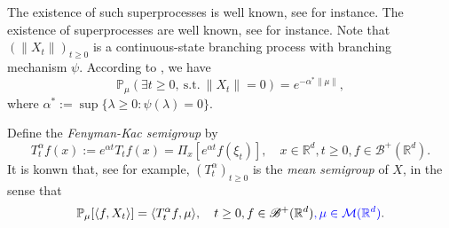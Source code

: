 \documentclass[12pt,oneside,english]{amsart}
\theoremstyle{plain}
\theoremstyle{definition}
\numberwithin{equation}{section}
\newcommand{\added}[1]{{\color{blue}#1}}\newcommand{\deleted}[1]{{\color{red}#1}}
\begin{document}
\deleted{
	The existence of such superprocesses is well known, see \cite{EB} for instance.
}
\added{
	The existence of superprocesses are well known, see \cite{EB} for instance.
}
    Note that $(\|X_t\|)_{t\geq 0}$ is a continuous-state branching process with branching mechanism $\psi$.
    According to \cite[Theorem 12.5 \& Theorem 12.7]{Kyprianou2014Fluctuations}, we have
\begin{equation}
    \mathbb{P}_{\mu} (\exists t\geq 0,~\text{s.t.}~\|X_t\|=0)
    = e^{-\alpha^* \|\mu\|},
\end{equation}
    where $\alpha^* := \sup\{\lambda \geq 0: \psi(\lambda) = 0\}$.
    
    Define the \emph{Fenyman-Kac semigroup} by
\begin{equation}\label{meansemigroup}
    T^{\alpha}_t f(x)
    :=
    e^{\alpha t} T_t f(x) =
    \Pi_x [e^{\alpha t}f(\xi_t)],
    \quad x\in \mathbb{R}^d,t\geq 0, f\in \mathscr B^+(\mathbb R^d).
\end{equation}
    It is konwn that, see \cite[Proposition 2.27]{Li2011Measure-valued} for example, $(T^\alpha_t)_{t\geq 0}$ is the \emph{mean semigroup} of $X$, in the sense that
\begin{equation}\label{eq:meanformula}
    \mathbb{P}_{\mu}[\langle f, X_t \rangle]
    = \langle T_t^\alpha f, \mu \rangle,
    \quad t\geq 0, f\in \mathscr B^+(\mathbb R^d)\added{, \mu \in \mathcal M(\mathbb R^d)}.
\end{equation}
\end{document}
